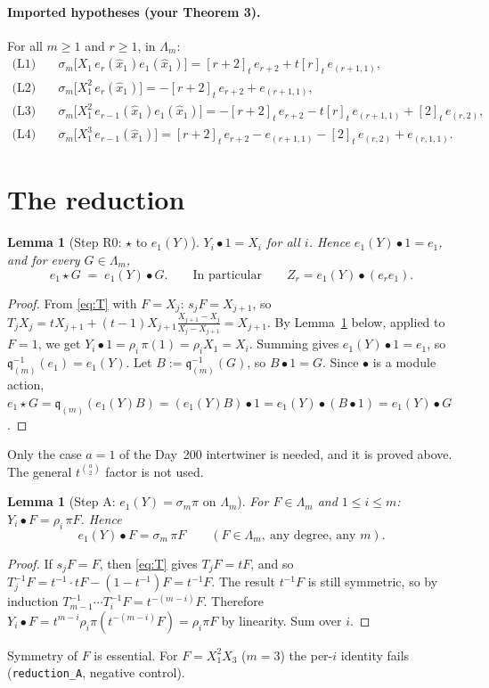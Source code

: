 \documentclass[11pt]{article}
\newcommand{\qint}[1]{[#1]_t}
\newcommand{\tl}{\widehat{x}_1}
\newcommand{\bul}{\bullet}
\newtheorem{lemma}[theorem]{Lemma}
\theoremstyle{definition}
\begin{document}
\paragraph{Imported hypotheses (your Theorem 3).} For all $m\ge1$ and $r\ge1$, in $\Lambda_m$:
\begin{align*}
\text{(L1)}\quad & \sigma_m\bigl[X_1\,e_r(\tl)e_1(\tl)\bigr] = \qint{r+2}\,e_{r+2}+t\qint r\,e_{(r+1,1)},\\
\text{(L2)}\quad & \sigma_m\bigl[X_1^2\,e_r(\tl)\bigr] = -\qint{r+2}\,e_{r+2}+e_{(r+1,1)},\\
\text{(L3)}\quad & \sigma_m\bigl[X_1^2\,e_{r-1}(\tl)e_1(\tl)\bigr] = -\qint{r+2}\,e_{r+2}-t\qint r\,e_{(r+1,1)}+\qint2\,e_{(r,2)},\\
\text{(L4)}\quad & \sigma_m\bigl[X_1^3\,e_{r-1}(\tl)\bigr] = \qint{r+2}\,e_{r+2}-e_{(r+1,1)}-\qint2\,e_{(r,2)}+e_{(r,1,1)}.
\end{align*}

\section{The reduction}

\begin{lemma}[Step R0: $\star$ to $e_1(Y)$]\label{lem:R0}
$Y_i\bul1=X_i$ for all $i$. Hence $e_1(Y)\bul1=e_1$, and for every $G\in\Lambda_m$,
\[
e_1\star G \;=\; e_1(Y)\bul G. \qquad\text{In particular}\qquad Z_r=e_1(Y)\bul(e_re_1).
\]
\end{lemma}
\begin{proof}
From \eqref{eq:T} with $F=X_j$: $s_jF=X_{j+1}$, so
$T_jX_j=tX_{j+1}+(t-1)X_{j+1}\frac{X_{j+1}-X_j}{X_j-X_{j+1}}=X_{j+1}$.
By Lemma~\ref{lem:A} below, applied to $F=1$, we get $Y_i\bul1=\rho_i\,\pi(1)=\rho_i X_1=X_i$. Summing gives
$e_1(Y)\bul1=e_1$, so $\mathfrak q^{-1}_{(m)}(e_1)=e_1(Y)$. Let $B:=\mathfrak q_{(m)}^{-1}(G)$, so
$B\bul1=G$. Since $\bul$ is a module action,
$e_1\star G=\mathfrak q_{(m)}(e_1(Y)B)=(e_1(Y)B)\bul1=e_1(Y)\bul(B\bul1)=e_1(Y)\bul G$.
\end{proof}
Only the case $a=1$ of the Day~200 intertwiner is needed, and it is proved above.
The general $t^{\binom a2}$ factor is not used.

\begin{lemma}[Step A: $e_1(Y)=\sigma_m\pi$ on $\Lambda_m$]\label{lem:A}
For $F\in\Lambda_m$ and $1\le i\le m$: $Y_i\bul F=\rho_i\,\pi F$. Hence
\[
e_1(Y)\bul F=\sigma_m\,\pi F\qquad(F\in\Lambda_m,\ \text{any degree, any }m).
\]
\end{lemma}
\begin{proof}
If $s_jF=F$, then \eqref{eq:T} gives $T_jF=tF$, and so $T_j^{-1}F=t^{-1}\cdot tF-(1-t^{-1})F=t^{-1}F$.
The result $t^{-1}F$ is still symmetric, so by induction
$T_{m-1}^{-1}\cdots T_i^{-1}F=t^{-(m-i)}F$. Therefore
$Y_i\bul F=t^{m-i}\rho_i\pi(t^{-(m-i)}F)=\rho_i\pi F$ by linearity. Sum over $i$.
\end{proof}
Symmetry of $F$ is essential. For $F=X_1^2X_3$ ($m=3$) the per-$i$ identity fails
(\texttt{reduction\_A}, negative control).
\end{document}
